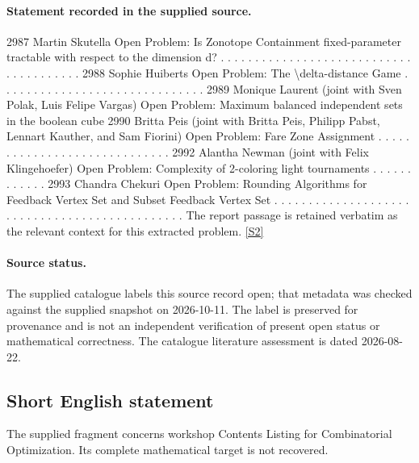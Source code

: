 \documentclass[11pt]{article}
\newcommand{\sref}[2]{\hyperlink{source:#1:#2}{[S#2]}}
\begin{document}
\paragraph{Statement recorded in the supplied source.}
2987 Martin Skutella Open Problem: Is Zonotope Containment fixed-parameter tractable with respect to the dimension d? . . . . . . . . . . . . . . . . . . . . . . . . . . . . . . . . . . . . . . . 2988 Sophie Huiberts Open Problem: The \textbackslash{}delta-distance Game . . . . . . . . . . . . . . . . . . . . . . . . . . . . . . 2989 Monique Laurent (joint with Sven Polak, Luis Felipe Vargas) Open Problem: Maximum balanced independent sets in the boolean cube 2990 Britta Peis (joint with Britta Peis, Philipp Pabst, Lennart Kauther, and Sam Fiorini) Open Problem: Fare Zone Assignment . . . . . . . . . . . . . . . . . . . . . . . . . . . . . 2992 Alantha Newman (joint with Felix Klingehoefer) Open Problem: Complexity of 2-coloring light tournaments . . . . . . . . . . . . 2993 Chandra Chekuri Open Problem: Rounding Algorithms for Feedback Vertex Set and Subset Feedback Vertex Set . . . . . . . . . . . . . . . . . . . . . . . . . . . . . . . . . . . . . . . . . . . . . . The report passage is retained verbatim as the relevant context for this extracted problem. \sref{30006103}{2}
\paragraph{Source status.}
The supplied catalogue labels this source record open; that metadata was checked against the supplied snapshot on 2026-10-11. The label is preserved for provenance and is not an independent verification of present open status or mathematical correctness. The catalogue literature assessment is dated 2026-08-22.
\subsection{Short English statement}
The supplied fragment concerns workshop Contents Listing for Combinatorial Optimization. Its complete mathematical target is not recovered.
\end{document}
